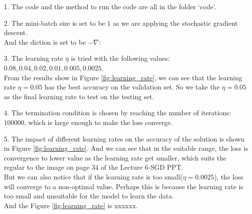 \documentclass{article}
\begin{document}
1. The code and the method to run the code are all in the folder `code'.

2. The mini-batch size is set to be $1$ as we are applying the stochastic gradient descent.\\
And the diction is set to be $-\nabla $:


3. The learning rate $\eta$ is tried with the following values: $0.08, 0.04, 0.02, 0.01, 0.005, 0.0025$.\\
From the results show in Figure \ref{fig:learning_rate}, we can see that the learning rate $\eta = 0.05$ has the best accuracy on the validation set. So we take the $\eta=0.05$ as the final learning rate to test on the testing set.

4. The termination condition is chosen by reaching the number of iterations: $100000$, which is large enough to make the loss converge.

5. The impact of different learning rates on the accuracy of the solution is shown in Figure \ref{fig:learning_rate}. And we can see that in the suitable range, the loss is convergence to lower value as the learning rate get smaller, which suits the regular to the image on page $34$ of the Lecture $6$-SGD PPT.\\
But we can also notice that if the learning rate is too small($\eta=0.0025$), the loss will converge to a non-optimal value. Perhaps this is because the learning rate is too small and unsuitable for the model to learn the data.\\

And the Figure \ref{fig:learning_rate} is xxxxxx.\\

\end{document}
